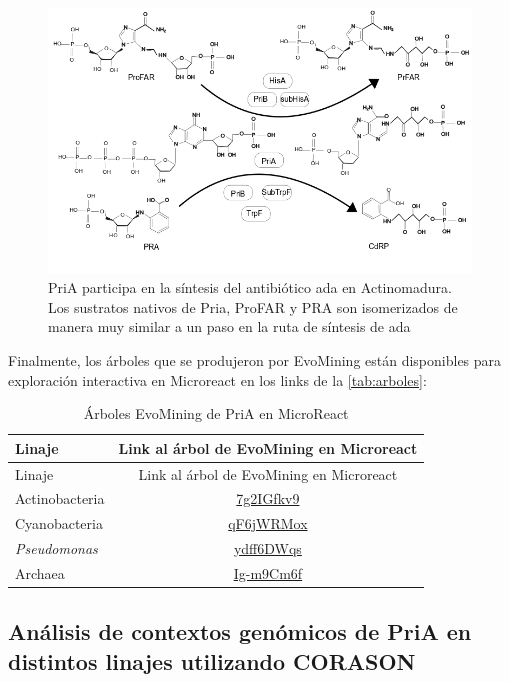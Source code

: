 \documentclass[12pt,twoside]{reedthesis}
\begin{document}
{  \begin{figure}[h!tbp]
  \centering
  \includegraphics[angle = 0,scale = 0.6]{chapter4/ada.png}
  \caption[PriA participa en la síntesis del antibiótico {ada} en {Actinomadura} ]{\footnotesize{PriA participa en la síntesis del antibiótico {ada} en {Actinomadura}. Los sustratos nativos de Pria, ProFAR y PRA son isomerizados de manera muy similar a un paso en la ruta de síntesis de {ada} }}
  \label{fig:ada}
  \end{figure}
  
  Finalmente, los árboles que se produjeron por EvoMining están
  disponibles para exploración interactiva en Microreact en los links de
  la \autoref{tab:arboles}:
  
  \begin{longtable}[]{@{}lc@{}}
  \caption{Árboles EvoMining de PriA en MicroReact
  \label{tab:arboles}}\tabularnewline
  \toprule
  Linaje & Link al árbol de EvoMining en Microreact\tabularnewline
  \midrule
  \endfirsthead
  \toprule
  Linaje & Link al árbol de EvoMining en Microreact\tabularnewline
  \midrule
  \endhead
  Actinobacteria &
  \href{https://microreact.org/project/7g2IGfkv9}{7g2IGfkv9}\tabularnewline
  Cyanobacteria &
  \href{https://microreact.org/project/qF6jWRMox}{qF6jWRMox}\tabularnewline
  \emph{Pseudomonas} &
  \href{https://microreact.org/project/ydff6DWqs}{ydff6DWqs}\tabularnewline
  Archaea &
  \href{https://microreact.org/project/Ig-m9Cm6f}{Ig-m9Cm6f}\tabularnewline
  \bottomrule
  \end{longtable}
  
  \subsection{Análisis de contextos genómicos de PriA en distintos linajes
  utilizando
  CORASON}\label{analisis-de-contextos-genomicos-de-pria-en-distintos-linajes-utilizando-corason}
  
}
\end{document}
